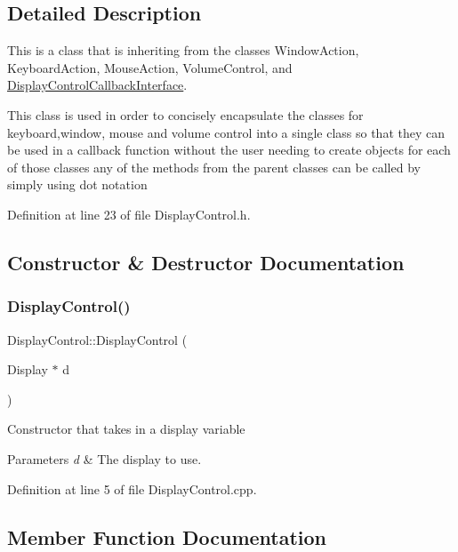 \subsection{Detailed Description}
This is a class that is inheriting from the classes Window\+Action, Keyboard\+Action, Mouse\+Action, Volume\+Control, and \hyperlink{class_gestro_1_1_display_control_callback_interface}{Display\+Control\+Callback\+Interface}. 

This class is used in order to concisely encapsulate the classes for keyboard,window, mouse and volume control into a single class so that they can be used in a callback function without the user needing to create objects for each of those classes any of the methods from the parent classes can be called by simply using dot notation 

Definition at line 23 of file Display\+Control.\+h.



\subsection{Constructor \& Destructor Documentation}
\mbox{\label{class_gestro_1_1_display_control_a4d2a5053b250bbd1f3103795cb29fcde}} 
\subsubsection{\texorpdfstring{Display\+Control()}{DisplayControl()}}
{\footnotesize\ttfamily Display\+Control\+::\+Display\+Control (\begin{DoxyParamCaption}\item[{Display $\ast$}]{d }\end{DoxyParamCaption})}

Constructor that takes in a display variable


\begin{DoxyParams}{Parameters}
{\em d} & The display to use. \\
\hline
\end{DoxyParams}


Definition at line 5 of file Display\+Control.\+cpp.



\subsection{Member Function Documentation}
\mbox{\label{class_gestro_1_1_display_control_a5f45c36e699afa1d56b2af78e5125aca}} 
